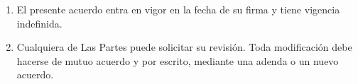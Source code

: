 
\begin{enumerate}[label=\arabic*., leftmargin=*, itemsep=0.3em]
  \item El presente acuerdo entra en vigor en la fecha de su firma y tiene vigencia indefinida.
  \item Cualquiera de Las Partes puede solicitar su revisión. Toda modificación debe hacerse de mutuo acuerdo y por escrito, mediante una adenda o un nuevo acuerdo.
\end{enumerate}
